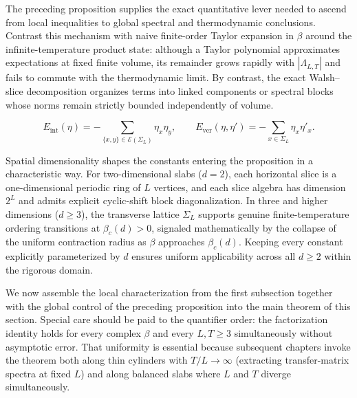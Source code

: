 \documentclass[11pt]{article}
\theoremstyle{definition}
\begin{document}
The preceding proposition supplies the exact quantitative lever needed to ascend
from local inequalities to global spectral and thermodynamic conclusions. Contrast
this mechanism with naive finite-order Taylor expansion in $\beta$ around the
infinite-temperature product state: although a Taylor polynomial approximates
expectations at fixed finite volume, its remainder grows rapidly with
$|\Lambda_{L,T}|$ and fails to commute with the thermodynamic limit. By contrast,
the exact Walsh--slice decomposition organizes terms into linked components or
spectral blocks whose norms remain strictly bounded independently of volume.

\[
  E_{\mathrm{int}}(\eta) = -\sum_{\{x,y\} \in \mathcal{E}(\Sigma_L)} \eta_x \eta_y, \qquad E_{\mathrm{ver}}(\eta, \eta') = -\sum_{x \in \Sigma_L} \eta_x \eta'_x.
\]

Spatial dimensionality shapes the constants entering the proposition in a
characteristic way. For two-dimensional slabs ($d = 2$), each horizontal slice is a
one-dimensional periodic ring of $L$ vertices, and each slice algebra has dimension
$2^L$ and admits explicit cyclic-shift block diagonalization. In three and higher
dimensions ($d \ge 3$), the transverse lattice $\Sigma_L$ supports genuine
finite-temperature ordering transitions at $\beta_c(d) > 0$, signaled mathematically
by the collapse of the uniform contraction radius as $\beta$ approaches
$\beta_c(d)$. Keeping every constant explicitly parameterized by $d$ ensures uniform
applicability across all $d \ge 2$ within the rigorous domain.

We now assemble the local characterization from the first subsection together with
the global control of the preceding proposition into the main theorem of this
section. Special care should be paid to the quantifier order: the factorization
identity holds for every complex $\beta$ and every $L, T \ge 3$ simultaneously
without asymptotic error. That uniformity is essential because subsequent chapters
invoke the theorem both along thin cylinders with $T/L \to \infty$ (extracting
transfer-matrix spectra at fixed $L$) and along balanced slabs where $L$ and $T$
diverge simultaneously.
\end{document}
